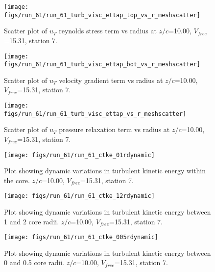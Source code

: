 \begin{figure}[H]
\centering
\texttt{[image: figs/run\_61/run\_61\_turb\_visc\_ettap\_top\_vs\_r\_meshscatter]}
\caption{Scatter plot of $
u_T$ reynolds stress term vs radius at $z/c$=10.00, $V_{free}$=15.31, station 7.}
\label{fig:run_61_turb_visc_ettap_top_vs_r_meshscatter}
\end{figure}


\begin{figure}[H]
\centering
\texttt{[image: figs/run\_61/run\_61\_turb\_visc\_ettap\_bot\_vs\_r\_meshscatter]}
\caption{Scatter plot of $
u_T$ velocity gradient term vs radius at $z/c$=10.00, $V_{free}$=15.31, station 7.}
\label{fig:run_61_turb_visc_ettap_bot_vs_r_meshscatter}
\end{figure}


\begin{figure}[H]
\centering
\texttt{[image: figs/run\_61/run\_61\_turb\_visc\_ettap\_vs\_r\_meshscatter]}
\caption{Scatter plot of $
u_T$ pressure relaxation term vs radius at $z/c$=10.00, $V_{free}$=15.31, station 7.}
\label{fig:run_61_turb_visc_ettap_vs_r_meshscatter}
\end{figure}


\begin{figure}[H]
\centering
\texttt{[image: figs/run\_61/run\_61\_ctke\_01rdynamic]}
\caption{Plot showing dynamic variations in turbulent kinetic energy within the core. $z/c$=10.00, $V_{free}$=15.31, station 7.}
\label{fig:run_61_ctke_01rdynamic}
\end{figure}


\begin{figure}[H]
\centering
\texttt{[image: figs/run\_61/run\_61\_ctke\_12rdynamic]}
\caption{Plot showing dynamic variations in turbulent kinetic energy between 1 and 2 core radii. $z/c$=10.00, $V_{free}$=15.31, station 7.}
\label{fig:run_61_ctke_12rdynamic}
\end{figure}


\begin{figure}[H]
\centering
\texttt{[image: figs/run\_61/run\_61\_ctke\_005rdynamic]}
\caption{Plot showing dynamic variations in turbulent kinetic energy between 0 and 0.5 core radii. $z/c$=10.00, $V_{free}$=15.31, station 7.}
\label{fig:run_61_ctke_005rdynamic}
\end{figure}


